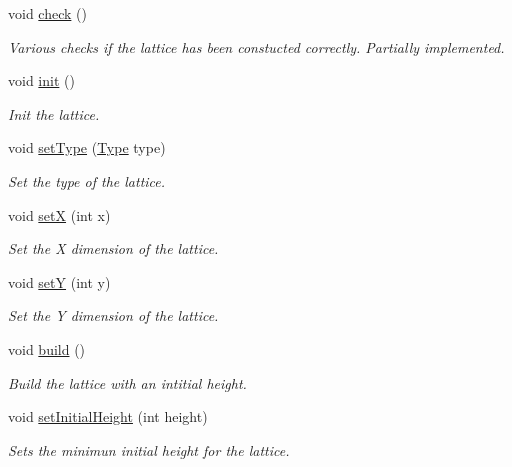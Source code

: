\begin{DoxyCompactItemize}
void \mbox{\hyperlink{classLattice_ad85ed4a582942c2ae7346f3e3177e962}{check}} ()
\begin{DoxyCompactList}\small\item\em Various checks if the lattice has been constucted correctly. Partially implemented. \end{DoxyCompactList}\item 
\mbox{\label{classLattice_af4b8aea57fbe61b8c99352a56b88ecdd}} 
void \mbox{\hyperlink{classLattice_af4b8aea57fbe61b8c99352a56b88ecdd}{init}} ()
\begin{DoxyCompactList}\small\item\em Init the lattice. \end{DoxyCompactList}\item 
\mbox{\label{classLattice_a0bfe2ce023eded6bac20ba652b93eab2}} 
void \mbox{\hyperlink{classLattice_a0bfe2ce023eded6bac20ba652b93eab2}{set\+Type}} (\mbox{\hyperlink{classLattice_a0521158021627f01f6bb0a9c72df65e2}{Type}} type)
\begin{DoxyCompactList}\small\item\em Set the type of the lattice. \end{DoxyCompactList}\item 
\mbox{\label{classLattice_a195be05258d896fe3342e4eac2f3ffee}} 
void \mbox{\hyperlink{classLattice_a195be05258d896fe3342e4eac2f3ffee}{setX}} (int x)
\begin{DoxyCompactList}\small\item\em Set the X dimension of the lattice. \end{DoxyCompactList}\item 
\mbox{\label{classLattice_ae79cea22c63903e846d4858250b80ed9}} 
void \mbox{\hyperlink{classLattice_ae79cea22c63903e846d4858250b80ed9}{setY}} (int y)
\begin{DoxyCompactList}\small\item\em Set the Y dimension of the lattice. \end{DoxyCompactList}\item 
\mbox{\label{classLattice_a079f2eedf2fcdd34a85766a4f08ca9c4}} 
void \mbox{\hyperlink{classLattice_a079f2eedf2fcdd34a85766a4f08ca9c4}{build}} ()
\begin{DoxyCompactList}\small\item\em Build the lattice with an intitial height. \end{DoxyCompactList}\item 
\mbox{\label{classLattice_a3d953999db7b36864a89aea221a1ddc6}} 
void \mbox{\hyperlink{classLattice_a3d953999db7b36864a89aea221a1ddc6}{set\+Initial\+Height}} (int height)
\begin{DoxyCompactList}\small\item\em Sets the minimun initial height for the lattice. \end{DoxyCompactList}\end{DoxyCompactItemize}
